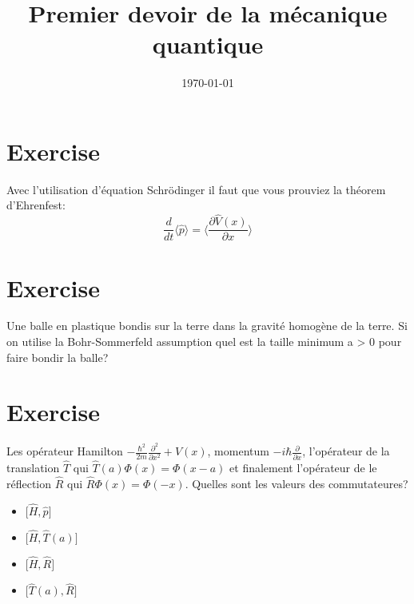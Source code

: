 \documentclass[12pt, a4paper]{article}
\author{}
\title{Premier devoir de la mécanique quantique}
\date{\today}
\begin{document}
\maketitle
\section{Exercise}
\par Avec  l'utilisation d'équation Schrödinger il faut que vous prouviez la théorem d'Ehrenfest:
\begin{equation*}
\frac{d}{dt}\big \langle \hat{p} \big \rangle = \bigg \langle \frac{\partial \hat{V}(x)}{\partial x} \bigg \rangle
\end{equation*}
\section{Exercise}
\par Une balle en plastique bondis sur la terre dans la gravité homogène de la terre. Si on utilise
la Bohr-Sommerfeld assumption quel est la taille minimum a > 0 pour faire bondir la balle?
\section{Exercise}
\par Les opérateur Hamilton $-\frac{\hbar^{2}}{2m}\frac{\partial^{2}}{\partial x^{2}} + V(x)$, momentum
$-i\hbar\frac{\partial}{\partial x}$, l'opérateur de la translation $\hat{T}$ qui $\hat{T}(a) \Phi(x)= \Phi(x-a)$ et 
finalement l'opérateur de le réflection $\hat{R}$ qui $\hat{R}\Phi(x) = \Phi(-x)$. Quelles sont les valeurs des commutateures?
\begin{itemize}
    \item $\Big[\hat{H}, \hat{p}\Big]$
    \item $\Big[\hat{H}, \hat{T}(a)\Big]$
    \item $\Big[\hat{H}, \hat{R}\Big]$
    \item $\Big[\hat{T}(a), \hat{R}\Big]$
\end{itemize}
\end{document}
